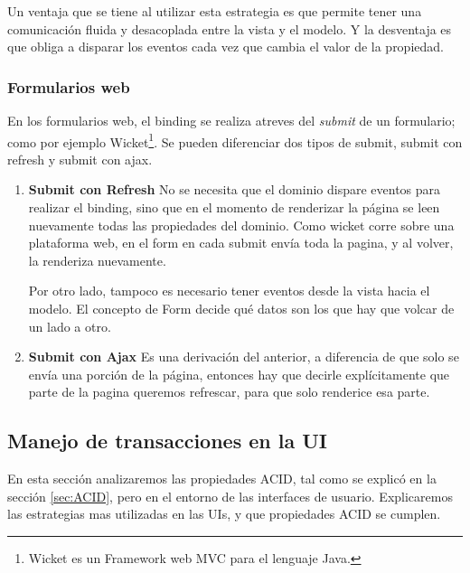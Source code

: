 		Un ventaja que se tiene al utilizar esta estrategia es que permite tener una
		comunicación fluida y desacoplada entre la vista y el modelo.
		Y la desventaja es que obliga a disparar los eventos cada vez que cambia el
		valor de la propiedad.
	
	\subsubsection{Formularios web}
		En los formularios web, el binding se realiza atreves del \emph{submit} de un
		formulario; como por ejemplo Wicket\footnote{Wicket es un Framework web MVC
		para el lenguaje Java.}. 
		Se pueden diferenciar dos tipos de submit, submit con refresh y submit con
		ajax.
		 
		\begin {enumerate}
		
			\item{\bf Submit con Refresh}  No se necesita que el dominio dispare eventos
			para realizar el binding, sino que en el momento de renderizar la página se
			leen nuevamente todas las propiedades del dominio.
			Como wicket corre sobre una plataforma web, en el form en cada submit envía  
			toda la pagina, y al volver, la renderiza nuevamente.
			
			Por otro lado, tampoco es necesario tener eventos desde la vista hacia el
			modelo. El concepto de Form decide qué datos son los que hay que volcar de un
			lado a otro.
		
			\item {\bf Submit con Ajax} 
			Es una derivación del anterior, a diferencia de que solo se envía
			una porción de la página, entonces hay que decirle explícitamente que parte
			de la pagina queremos refrescar, para que solo renderice esa parte.

		\end {enumerate}
		
		



\subsection{Manejo de transacciones en la UI}

	En esta sección analizaremos las propiedades ACID, tal como se
	explicó en la sección \ref{sec:ACID},  pero en el entorno de las interfaces
	de usuario.
	Explicaremos las estrategias mas utilizadas en las UIs, y que propiedades ACID
	se cumplen.


